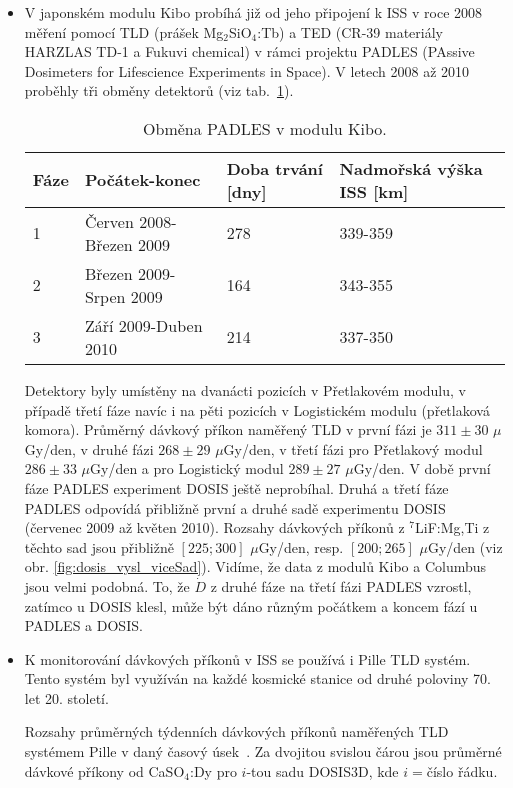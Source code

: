\begin{itemize}
  \item V japonském modulu Kibo \cite{kibo} probíhá již od jeho připojení k ISS v roce 2008 měření pomocí TLD (prášek Mg$_2$SiO$_4$:Tb) a TED (CR-39 materiály HARZLAS TD-1 a Fukuvi chemical) v rámci projektu PADLES (PAssive Dosimeters for Lifescience Experiments in Space). V letech 2008 až 2010 proběhly tři obměny detektorů (viz tab.~\ref{tab:dosis_kibo}).
	\begin{table}[ht]
	  \centering
	  \caption{Obměna PADLES v modulu Kibo. \cite{japonsky}}
	  \label{tab:dosis_kibo}
	  \begin{tabular}{llll}
		\toprule
	Fáze&Počátek-konec&Doba trvání [dny]&Nadmořská výška ISS [km]\\
	\midrule
	1&Červen 2008-Březen 2009&278&339-359\\
	2&Březen 2009-Srpen 2009&164&343-355\\
	3&Září 2009-Duben 2010&214&337-350\\
	\bottomrule
	  \end{tabular}
	\end{table}
	Detektory byly umístěny na dvanácti pozicích v Přetlakovém modulu, v případě třetí fáze navíc i na pěti pozicích v Logistickém modulu (přetlaková komora). Průměrný dávkový příkon naměřený TLD v první fázi je $311\pm 30$ $\mu$Gy/den, v druhé fázi $268\pm29$ $\mu$Gy/den, v třetí fázi pro Přetlakový modul $286\pm33$ $\mu$Gy/den a pro Logistický modul $289\pm27$ $\mu$Gy/den. V době první fáze PADLES experiment DOSIS ještě neprobíhal. Druhá a třetí fáze PADLES odpovídá přibližně první a druhé sadě experimentu DOSIS (červenec 2009 až květen 2010). Rozsahy dávkových příkonů z $^7$LiF:Mg,Ti z těchto sad jsou přibližně $[225;300]$ $\mu$Gy/den, resp. $[200;265]$ $\mu$Gy/den (viz obr. \ref{fig:dosis_vysl_viceSad}). Vidíme, že data z modulů Kibo a Columbus jsou velmi podobná. To, že $\dot{D}$ z druhé fáze na třetí fázi PADLES
	vzrostl,
	zatímco u DOSIS klesl, může být dáno různým počátkem a koncem fází u PADLES a DOSIS. \cite{japonsky}
  \item K monitorování dávkových příkonů v ISS se používá i Pille TLD systém. Tento systém byl využíván na každé kosmické stanice od druhé poloviny 70. let 20. století.
	\begin{table}[ht]
	  \centering
	  \caption{Rozsahy průměrných týdenních dávkových příkonů naměřených TLD systémem Pille v daný časový úsek~\cite{pille, pille2}. Za dvojitou svislou čárou jsou průměrné dávkové příkony od CaSO$_4$:Dy pro $i$-tou sadu DOSIS3D, kde $i=$číslo řádku.}
	  \label{tab:dosis_pille}

\end{table}
\end{itemize}

